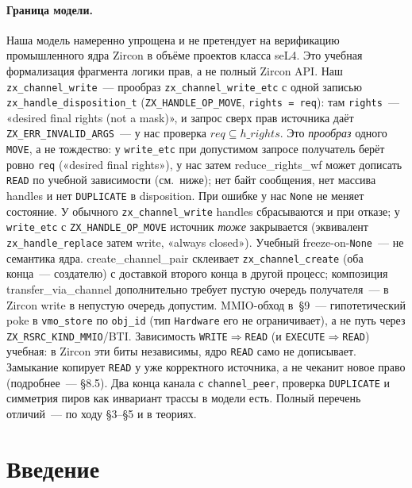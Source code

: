 \documentclass[11pt,a4paper]{article}
\newcommand{\isabel}[1]{{\isabelleit #1}}
\newcommand{\lemmaname}[1]{\isabel{#1}}
\begin{document}
\paragraph{Граница модели.}
Наша модель намеренно упрощена и не претендует на верификацию промышленного ядра Zircon
в объёме проектов класса seL4. Это учебная формализация фрагмента логики прав, а не полный Zircon API.
Наш \texttt{zx\_channel\_write}~--- прообраз
\texttt{zx\_channel\_write\_etc} с одной записью
\texttt{zx\_handle\_disposition\_t}
(\texttt{ZX\_HANDLE\_OP\_MOVE}, \texttt{rights = req}): там
\texttt{rights}~--- «desired final rights (not a mask)», и запрос сверх
прав источника даёт \texttt{ZX\_ERR\_INVALID\_ARGS}~--- у нас проверка
$\mathit{req}\subseteq h\_rights$. Это \emph{прообраз} одного
\texttt{MOVE}, а не тождество: у \texttt{write\_etc} при допустимом
запросе получатель берёт ровно \texttt{req} («desired final rights»),
у нас затем \lemmaname{reduce\_rights\_wf} может дописать
\texttt{READ} по учебной зависимости (см.\ ниже); нет байт сообщения,
нет массива handles и нет \texttt{DUPLICATE} в disposition.
При ошибке у нас \texttt{None} не меняет состояние. У обычного
\texttt{zx\_channel\_write} handles сбрасываются и при отказе; у
\texttt{write\_etc} с \texttt{ZX\_HANDLE\_OP\_MOVE} источник
\emph{тоже} закрывается (эквивалент \texttt{zx\_handle\_replace} затем
write, «always closed»). Учебный freeze-on-\texttt{None}~--- не
семантика ядра.
\lemmaname{create\_channel\_pair} склеивает \texttt{zx\_channel\_create}
(оба конца~--- создателю) с доставкой второго конца в другой процесс;
композиция \lemmaname{transfer\_via\_channel} дополнительно требует
пустую очередь получателя~--- в Zircon write в непустую очередь
допустим. MMIO-обход в~§9~--- гипотетический poke в
\texttt{vmo\_store} по \texttt{obj\_id} (тип \texttt{Hardware} его не
ограничивает), а не путь через \texttt{ZX\_RSRC\_KIND\_MMIO}/BTI.
Зависимость
\texttt{WRITE}$\Rightarrow$\texttt{READ} (и \texttt{EXECUTE}$\Rightarrow$\texttt{READ})
учебная: в Zircon эти биты независимы, ядро \texttt{READ} само не
дописывает. Замыкание копирует \texttt{READ} у уже корректного
источника, а не чеканит новое право (подробнее~--- §8.5). Два конца
канала с \texttt{channel\_peer}, проверка \texttt{DUPLICATE} и симметрия
пиров как инвариант трассы в модели есть. Полный перечень отличий~--- по
ходу §3--§5 и в теориях.

\section{Введение}
\end{document}
